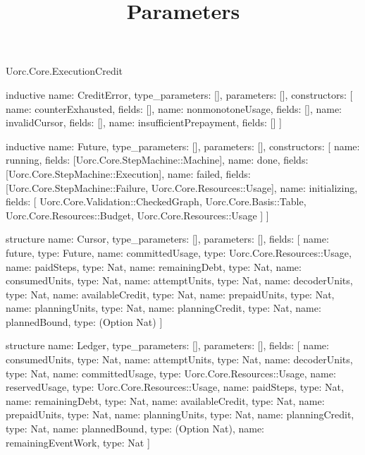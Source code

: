 \begin{lexlean}{Uorc.Core.ExecutionCredit}
\title{Parameters}
\begin{semanticmodule}
inductive{
  name: CreditError,
  type_parameters: [],
  parameters: [],
  constructors: [
    {name: counterExhausted, fields: []},
    {name: nonmonotoneUsage, fields: []},
    {name: invalidCursor, fields: []},
    {name: insufficientPrepayment, fields: []}
  ]
}

inductive{
  name: Future,
  type_parameters: [],
  parameters: [],
  constructors: [
    {name: running, fields: [Uorc.Core.StepMachine::Machine]},
    {name: done, fields: [Uorc.Core.StepMachine::Execution]},
    {name: failed, fields: [Uorc.Core.StepMachine::Failure, Uorc.Core.Resources::Usage]},
    {
      name: initializing,
      fields: [
        Uorc.Core.Validation::CheckedGraph,
        Uorc.Core.Basis::Table,
        Uorc.Core.Resources::Budget,
        Uorc.Core.Resources::Usage
      ]
    }
  ]
}

structure{
  name: Cursor,
  type_parameters: [],
  parameters: [],
  fields: [
    {name: future, type: Future},
    {name: committedUsage, type: Uorc.Core.Resources::Usage},
    {name: paidSteps, type: Nat},
    {name: remainingDebt, type: Nat},
    {name: consumedUnits, type: Nat},
    {name: attemptUnits, type: Nat},
    {name: decoderUnits, type: Nat},
    {name: availableCredit, type: Nat},
    {name: prepaidUnits, type: Nat},
    {name: planningUnits, type: Nat},
    {name: planningCredit, type: Nat},
    {name: plannedBound, type: (Option Nat)}
  ]
}

structure{
  name: Ledger,
  type_parameters: [],
  parameters: [],
  fields: [
    {name: consumedUnits, type: Nat},
    {name: attemptUnits, type: Nat},
    {name: decoderUnits, type: Nat},
    {name: committedUsage, type: Uorc.Core.Resources::Usage},
    {name: reservedUsage, type: Uorc.Core.Resources::Usage},
    {name: paidSteps, type: Nat},
    {name: remainingDebt, type: Nat},
    {name: availableCredit, type: Nat},
    {name: prepaidUnits, type: Nat},
    {name: planningUnits, type: Nat},
    {name: planningCredit, type: Nat},
    {name: plannedBound, type: (Option Nat)},
    {name: remainingEventWork, type: Nat}
  ]
}


\end{semanticmodule}
\end{lexlean}
